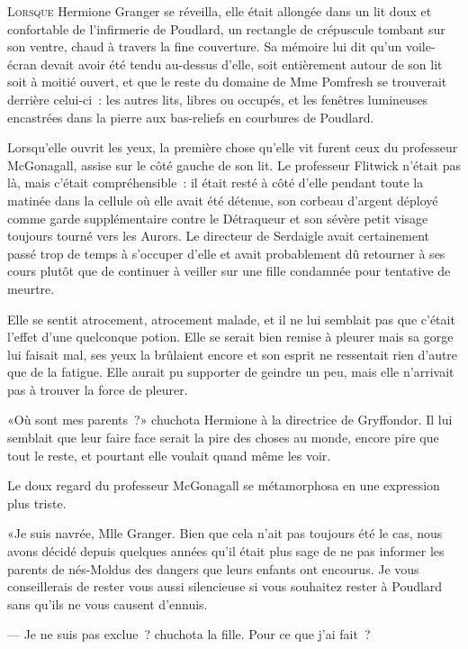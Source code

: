 
\lettrine{L}{orsque} Hermione Granger se réveilla, elle était allongée dans un lit doux et confortable de l'infirmerie de Poudlard, un rectangle de crépuscule tombant sur son ventre, chaud à travers la fine couverture. Sa mémoire lui dit qu'un voile-écran devait avoir été tendu au-dessus d'elle, soit entièrement autour de son lit soit à moitié ouvert, et que le reste du domaine de Mme Pomfresh se trouverait derrière celui-ci~: les autres lits, libres ou occupés, et les fenêtres lumineuses encastrées dans la pierre aux bas-reliefs en courbures de Poudlard.

Lorsqu'elle ouvrit les yeux, la première chose qu'elle vit furent ceux du professeur McGonagall, assise sur le côté gauche de son lit. Le professeur Flitwick n'était pas là, mais c'était compréhensible~: il était resté à côté d'elle pendant toute la matinée dans la cellule où elle avait été détenue, son corbeau d'argent déployé comme garde supplémentaire contre le Détraqueur et son sévère petit visage toujours tourné vers les Aurors. Le directeur de Serdaigle avait certainement passé trop de temps à s'occuper d'elle et avait probablement dû retourner à ses cours plutôt que de continuer à veiller sur une fille condamnée pour tentative de meurtre.

Elle se sentit atrocement, atrocement malade, et il ne lui semblait pas que c'était l'effet d'une quelconque potion. Elle se serait bien remise à pleurer mais sa gorge lui faisait mal, ses yeux la brûlaient encore et son esprit ne ressentait rien d'autre que de la fatigue. Elle aurait pu supporter de geindre un peu, mais elle n'arrivait pas à trouver la force de pleurer.

«Où sont mes parents~?» chuchota Hermione à la directrice de Gryffondor. Il lui semblait que leur faire face serait la pire des choses au monde, encore pire que tout le reste, et pourtant elle voulait quand même les voir.

Le doux regard du professeur McGonagall se métamorphosa en une expression plus triste.

«Je suis navrée, Mlle Granger. Bien que cela n'ait pas toujours été le cas, nous avons décidé depuis quelques années qu'il était plus sage de ne pas informer les parents de nés-Moldus des dangers que leurs enfants ont encourus. Je vous conseillerais de rester vous aussi silencieuse si vous souhaitez rester à Poudlard sans qu'ils ne vous causent d'ennuis.

--- Je ne suis pas exclue~? chuchota la fille. Pour ce que j'ai fait~?

